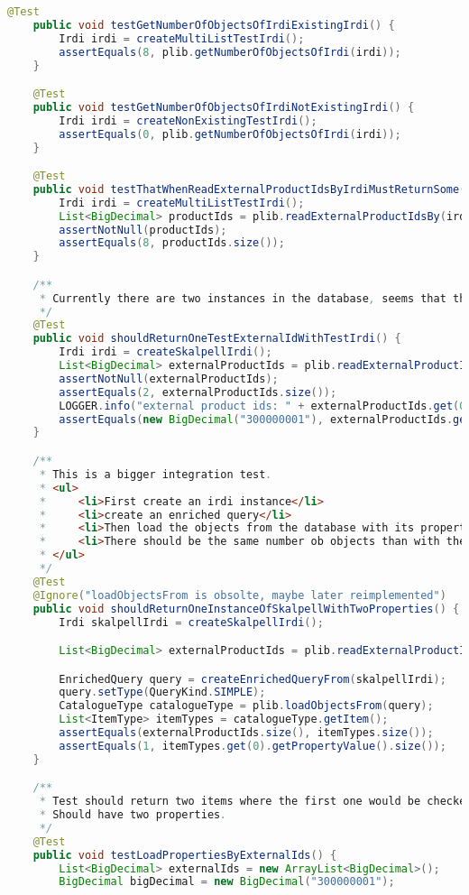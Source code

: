 \begin{lstlisting}[caption=Beispiel eines Integrationstests, language=Java, label=lst:integrationstest_beispiel]
    @Test
    public void testGetNumberOfObjectsOfIrdiExistingIrdi() {
        Irdi irdi = createMultiListTestIrdi();
        assertEquals(8, plib.getNumberOfObjectsOfIrdi(irdi));
    }

    @Test
    public void testGetNumberOfObjectsOfIrdiNotExistingIrdi() {
        Irdi irdi = createNonExistingTestIrdi();
        assertEquals(0, plib.getNumberOfObjectsOfIrdi(irdi));
    }

    @Test
    public void testThatWhenReadExternalProductIdsByIrdiMustReturnSome() throws Exception {
        Irdi irdi = createMultiListTestIrdi();
        List<BigDecimal> productIds = plib.readExternalProductIdsBy(irdi);
        assertNotNull(productIds);
        assertEquals(8, productIds.size());
    }

    /**
     * Currently there are two instances in the database, seems that these are duplicates but not sure.
     */
    @Test
    public void shouldReturnOneTestExternalIdWithTestIrdi() {
        Irdi irdi = createSkalpellIrdi();
        List<BigDecimal> externalProductIds = plib.readExternalProductIdsBy(irdi);
        assertNotNull(externalProductIds);
        assertEquals(2, externalProductIds.size());
        LOGGER.info("external product ids: " + externalProductIds.get(0));
        assertEquals(new BigDecimal("300000001"), externalProductIds.get(0));
    }

    /**
     * This is a bigger integration test.
     * <ul>
     *     <li>First create an irdi instance</li>
     *     <li>create an enriched query</li>
     *     <li>Then load the objects from the database with its properties</li>
     *     <li>There should be the same number ob objects than with the previous check</li>
     * </ul>
     */
    @Test
    @Ignore("loadObjectsFrom is obsolte, maybe later reimplemented")
    public void shouldReturnOneInstanceOfSkalpellWithTwoProperties() {
        Irdi skalpellIrdi = createSkalpellIrdi();

        List<BigDecimal> externalProductIds = plib.readExternalProductIdsBy(skalpellIrdi);

        EnrichedQuery query = createEnrichedQueryFrom(skalpellIrdi);
        query.setType(QueryKind.SIMPLE);
        CatalogueType catalogueType = plib.loadObjectsFrom(query);
        List<ItemType> itemTypes = catalogueType.getItem();
        assertEquals(externalProductIds.size(), itemTypes.size());
        assertEquals(1, itemTypes.get(0).getPropertyValue().size());
    }

    /**
     * Test should return two items where the first one would be checked.
     * Should have two properties.
     */
    @Test
    public void testLoadPropertiesByExternalIds() {
        List<BigDecimal> externalIds = new ArrayList<BigDecimal>();
        BigDecimal bigDecimal = new BigDecimal("300000001");


\end{lstlisting}
